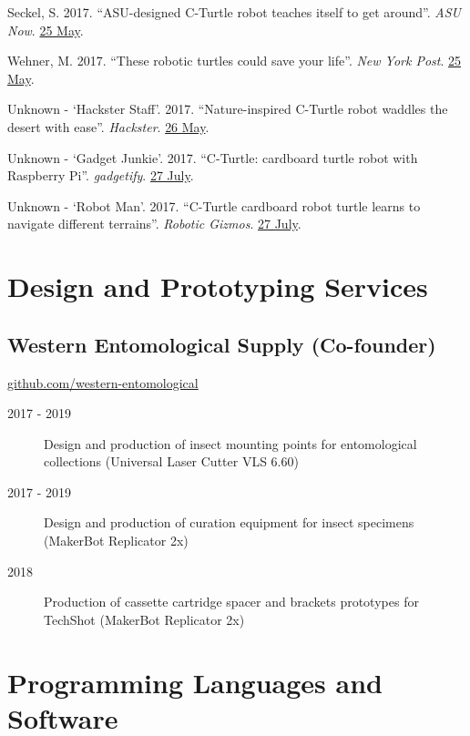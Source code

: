 \documentclass[12pt,a4paper]{article}
\begin{document}
\begin{description}
			\item Seckel, S. 2017. ``ASU-designed C-Turtle robot teaches itself to get around''. \textit{ASU Now}. \href{https://asunow.asu.edu/20170525-solutions-asu-designed-c-turtle-robot-teaches-itself-get-around}{25 May}.
			\item Wehner, M. 2017. ``These robotic turtles could save your life''. \textit{New York Post}. \href{https://nypost.com/2017/05/25/these-robotic-turtles-could-save-your-life/}{25 May}.
			\item Unknown - `Hackster Staff'. 2017. ``Nature-inspired C-Turtle robot waddles the desert with ease''. \textit{Hackster}. \href{https://blog.hackster.io/nature-inspired-c-turtle-robot-waddles-the-desert-with-ease-3061cbc19b36}{26 May}.
			\item Unknown - `Gadget Junkie'. 2017. ``C-Turtle: cardboard turtle robot with Raspberry Pi''. \textit{gadgetify}. \href{http://www.gadgetify.com/c-turtle-cardboard-turtle-robot/}{27 July}.
			\item Unknown - `Robot Man'. 2017. ``C-Turtle cardboard robot turtle learns to navigate different terrains''. \textit{Robotic Gizmos}. \href{http://www.roboticgizmos.com/c-turtle-robot-turtle/}{27 July}.
		\end{description}

\section*{Design and Prototyping Services}
	\subsection*{Western Entomological Supply (Co-founder)}
		\href{https://github.com/western-entomological}{github.com/western-entomological}
		\begin{description}
			\item [2017 - 2019] Design and production of insect mounting points for entomological collections (Universal Laser Cutter VLS 6.60)
			\item [2017 - 2019] Design and production of curation equipment for insect specimens (MakerBot Replicator 2x)
			\item [2018] Production of cassette cartridge spacer and brackets prototypes for TechShot (MakerBot Replicator 2x)
		\end{description}
	
\section*{Programming Languages and Software}
\end{document}
